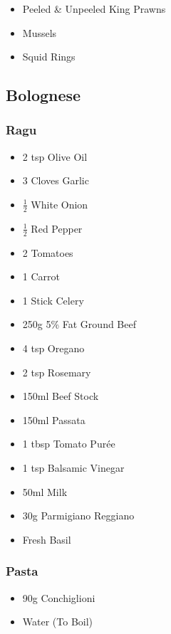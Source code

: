 \documentclass[11pt, english]{article}
\begin{document}
	\begin{itemize}
        \setlength\itemsep{0cm}
		\item Peeled \& Unpeeled King Prawns
		\item Mussels
		\item Squid Rings
        \end{itemize}

\newpage

	\subsection{Bolognese}

		\subsubsection*{Ragu}

	\begin{itemize}
        \setlength\itemsep{0cm}
		\item 2 tsp Olive Oil
		\item 3 Cloves Garlic
		\item $\frac{1}{2}$ White Onion
		\item $\frac{1}{2}$ Red Pepper
		\item 2 Tomatoes
		\item 1 Carrot
		\item 1 Stick Celery
		\item 250g 5\% Fat Ground Beef
		\item 4 tsp Oregano
		\item 2 tsp Rosemary
		\item 150ml Beef Stock
		\item 150ml Passata
		\item 1 tbsp Tomato Pur\'{e}e
		\item 1 tsp Balsamic Vinegar
		\item 50ml Milk
		\item 30g Parmigiano Reggiano
		\item Fresh Basil
        \end{itemize}

		\subsubsection*{Pasta}

	\begin{itemize}
        \setlength\itemsep{0cm}
                \item 90g Conchiglioni
		\item Water (To Boil)
        \end{itemize}
\end{document}
